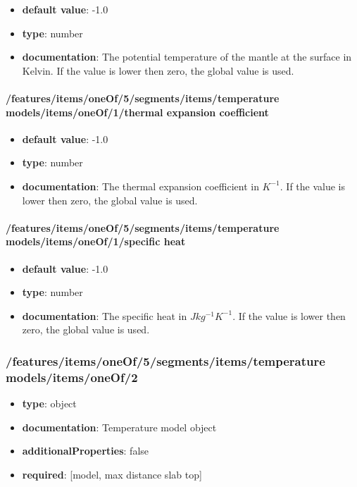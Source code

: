 \begin{itemize}\item {\bf default value}: -1.0
\item {\bf type}: number
\item {\bf documentation}: The potential temperature of the mantle at the surface in Kelvin. If the value is lower then zero, the global value is used.
\end{itemize}\paragraph{/features/items/oneOf/5/segments/items/temperature models/items/oneOf/1/thermal expansion coefficient}
\begin{itemize}\item {\bf default value}: -1.0
\item {\bf type}: number
\item {\bf documentation}: The thermal expansion coefficient in $K^{-1}$. If the value is lower then zero, the global value is used.
\end{itemize}\paragraph{/features/items/oneOf/5/segments/items/temperature models/items/oneOf/1/specific heat}
\begin{itemize}\item {\bf default value}: -1.0
\item {\bf type}: number
\item {\bf documentation}: The specific heat in $J kg^{-1} K^{-1}$. If the value is lower then zero, the global value is used.
\end{itemize}\subsubsection{/features/items/oneOf/5/segments/items/temperature models/items/oneOf/2}
\begin{itemize}\item {\bf type}: object
\item {\bf documentation}: Temperature model object
\item {\bf additionalProperties}: false
\item {\bf required}: [model, max distance slab top]\end{itemize}
